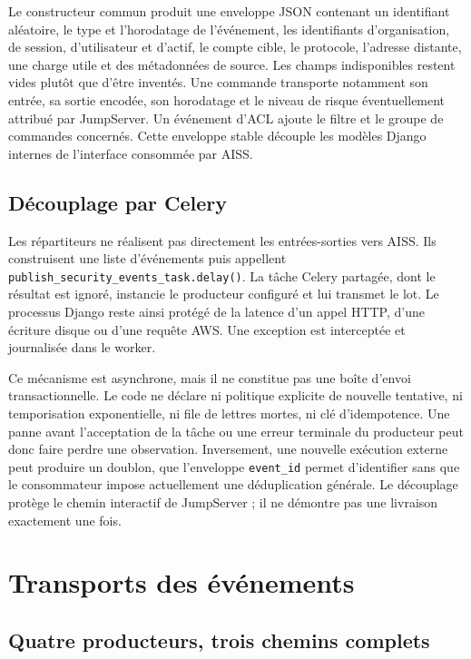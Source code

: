 \documentclass[11pt,a4paper,oneside]{report}
\theoremstyle{definition}
\theoremstyle{plain}
\begin{document}
Le constructeur commun produit une enveloppe JSON contenant un identifiant
aléatoire, le type et l'horodatage de l'événement, les identifiants
d'organisation, de session, d'utilisateur et d'actif, le compte cible, le
protocole, l'adresse distante, une charge utile et des métadonnées de source.
Les champs indisponibles restent vides plutôt que d'être inventés. Une
commande transporte notamment son entrée, sa sortie encodée, son horodatage et
le niveau de risque éventuellement attribué par JumpServer. Un événement
d'ACL ajoute le filtre et le groupe de commandes concernés. Cette enveloppe
stable découple les modèles Django internes de l'interface consommée par
AISS.

\subsection{Découplage par Celery}

Les répartiteurs ne réalisent pas directement les entrées-sorties vers AISS.
Ils construisent une liste d'événements puis appellent
\texttt{publish\_security\_events\_task.delay()}. La tâche Celery partagée,
dont le résultat est ignoré, instancie le producteur configuré et lui transmet
le lot. Le processus Django reste ainsi protégé de la latence d'un appel HTTP,
d'une écriture disque ou d'une requête AWS. Une exception est interceptée et
journalisée dans le worker.

Ce mécanisme est asynchrone, mais il ne constitue pas une boîte d'envoi
transactionnelle. Le code ne déclare ni politique explicite de nouvelle
tentative, ni temporisation exponentielle, ni file de lettres mortes, ni clé
d'idempotence. Une panne avant l'acceptation de la tâche ou une erreur
terminale du producteur peut donc faire perdre une observation. Inversement,
une nouvelle exécution externe peut produire un doublon, que l'enveloppe
\texttt{event\_id} permet d'identifier sans que le consommateur impose
actuellement une déduplication générale. Le découplage protège le chemin
interactif de JumpServer ; il ne démontre pas une livraison exactement une
fois.

\section{Transports des événements}

\subsection{Quatre producteurs, trois chemins complets}
\end{document}
